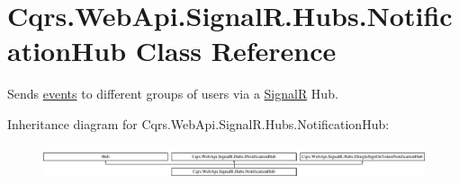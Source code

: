\hypertarget{classCqrs_1_1WebApi_1_1SignalR_1_1Hubs_1_1NotificationHub}{}\section{Cqrs.\+Web\+Api.\+Signal\+R.\+Hubs.\+Notification\+Hub Class Reference}
\label{classCqrs_1_1WebApi_1_1SignalR_1_1Hubs_1_1NotificationHub}


Sends \hyperlink{}{events} to different groups of users via a \hyperlink{namespaceCqrs_1_1WebApi_1_1SignalR}{SignalR} Hub.  


Inheritance diagram for Cqrs.\+Web\+Api.\+Signal\+R.\+Hubs.\+Notification\+Hub\+:\begin{figure}[H]
\begin{center}
\leavevmode
\includegraphics[height=0.987654cm]{classCqrs_1_1WebApi_1_1SignalR_1_1Hubs_1_1NotificationHub}
\end{center}
\end{figure}
